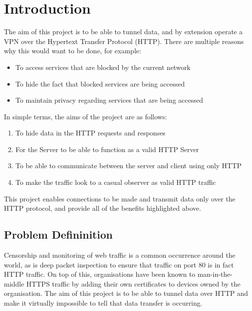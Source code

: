 \section{Introduction}
The aim of this project is to be able to tunnel data, and by extension operate a VPN over the Hypertext Transfer Protocol (HTTP). There are multiple reasons why this would want to be done, for example:
\begin{itemize}
    \item To access services that are blocked by the current network
    \item To hide the fact that blocked services are being accessed
    \item To maintain privacy regarding services that are being accessed
\end{itemize}

In simple terms, the aims of the project are as follows:
\begin{enumerate}
    \item To hide data in the HTTP requests and responses
    \item For the Server to be able to function as a valid HTTP Server
    \item To be able to communicate between the server and client using only HTTP
    \item To make the traffic look to a casual observer as valid HTTP traffic
\end{enumerate}

This project enables connections to be made and transmit data only over the HTTP protocol, and provide all of the benefits highlighted above.

\subsection{Problem Defininition}
Censorship and monitoring of web traffic is a common occurrence around the world, as is deep packet inspection to ensure that traffic on port 80 is in fact HTTP traffic.
On top of this, organisations have been known to man-in-the-middle HTTPS traffic by adding their own certificates to devices owned by the organisation.
The aim of this project is to be able to tunnel data over HTTP and make it virtually impossible to tell that data transfer is occurring.

